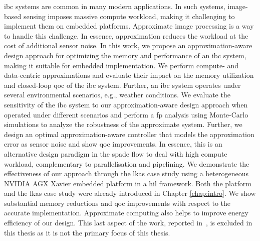 \Gls{ibc} systems are common in many modern applications. 
In such systems, image-based sensing imposes massive compute workload, making it challenging to implement them on embedded platforms. 
Approximate image processing is a way to handle this challenge. In essence, approximation reduces the workload at the cost of additional sensor noise. In this work, we propose an approximation-aware design approach for optimizing the memory and performance of an \gls{ibc} system, making it suitable for embedded implementation. We perform compute- and data-centric approximations and evaluate their impact on the memory utilization and closed-loop \gls{qoc} of the \gls{ibc} system. Further, an \gls{ibc} system operates under several environmental scenarios, e.g., weather conditions. We evaluate the sensitivity of the \gls{ibc} system to our approximation-aware design approach when operated under different scenarios and perform a \gls{fp} analysis using Monte-Carlo simulations to analyze the robustness of the approximate system. Further, we design an optimal approximation-aware controller that models the approximation error as sensor noise and show \gls{qoc} improvements. In essence, this is an alternative design paradigm in the \gls{spade} flow to deal with high compute workload, complementary to parallelisation and pipelining. We demonstrate the effectiveness of our approach through the \gls{lkas} case study using  a  heterogeneous  NVIDIA AGX  Xavier  embedded platform  in  a  \gls{hil} framework. Both the platform and the \gls{lkas} case study were already introduced in Chapter \ref{chap:intro}.
We show substantial memory reductions and \gls{qoc} improvements with respect to the accurate implementation.
Approximate computing also helps to improve energy efficiency of our design. This last aspect of the work, reported in~\cite{de2020access}, is excluded in this thesis as it is not the primary focus of this thesis.
